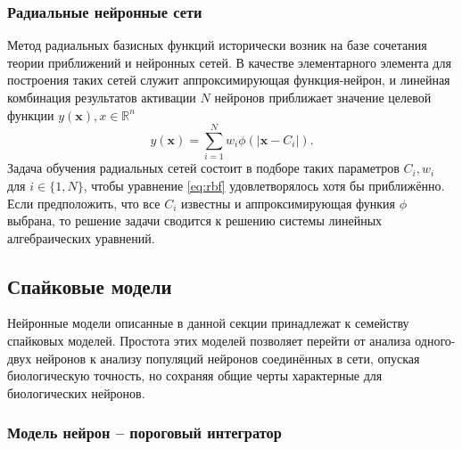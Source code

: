 \documentclass[a4paper,10pt]{article}
\begin{document}
\subsubsection{Радиальные нейронные сети}
\indent Метод радиальных базисных функций исторически возник на базе сочетания теории приближений и нейронных сетей. В качестве элементарного элемента для построения таких сетей служит аппроксимирующая функция-нейрон, и  линейная комбинация результатов активации $N$ нейронов приближает значение целевой функции $y(\boldsymbol{x}), x\in \mathbb{R}^n$
   \begin{equation}\label{eq:rbf}
   y(\boldsymbol{x}) = \sum_{i=1}^{N}w_{i}\phi(|\boldsymbol{x}-C_{i}|).
   \end{equation}
\indent Задача обучения радиальных сетей состоит в подборе таких параметров $C_{i},w_{i}$ для $i\in \{1,N\}$, чтобы уравнение \eqref{eq:rbf} удовлетворялось хотя бы приближённо. Если предположить, что все $C_{i}$ известны и аппроксимирующая функия $\phi$ выбрана, то решение задачи сводится к решению системы линейных алгебраических уравнений. \\
\subsection{Спайковые модели}   
\indent Нейронные модели описанные в данной секции принадлежат к семейству спайковых моделей. Простота этих моделей позволяет перейти от анализа одного-двух нейронов к анализу популяций нейронов соединённых в сети, опуская биологическую точность, но сохраняя общие черты характерные для биологических нейронов.\\
\subsubsection{Модель нейрон -- пороговый интегратор}
\end{document}
